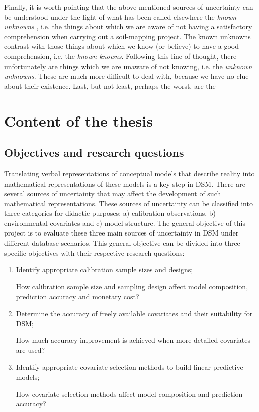 Finally, it is worth pointing that the above mentioned sources of uncertainty can be understood 
under the light of what has been called elsewhere the \textit{known unknowns} \citep{Wikipedia2015},
i.e. the things about which we are aware of not having a satisfactory comprehension when carrying 
out a soil-mapping project. The known unknowns contrast with those things about which we know (or 
believe) to have a good comprehension, i.e. the \textit{known knowns}. Following this line of 
thought, there unfortunately are things which we are unaware of not knowing, i.e. the 
\textit{unknown unknowns}. These are much more difficult to deal with, because we have no clue about 
their existence. Last, but not least, perhaps the worst, are the 


\section{Content of the thesis}

\subsection{Objectives and research questions}



Translating verbal representations of conceptual models that describe reality 
into mathematical representations of these models is a key step in DSM. There 
are several sources of uncertainty that may affect the development of such 
mathematical representations. These sources of uncertainty can be classified 
into three categories for didactic purposes: a) calibration observations, b) 
environmental covariates and c) model structure. The general objective of this 
project is to evaluate these three main sources of uncertainty in DSM under 
different database scenarios. This general objective can be divided into three 
specific objectives with their respective research questions:

\begin{enumerate}
  \item Identify appropriate calibration sample sizes and designs;

   How calibration sample size and sampling 
  design affect model composition, prediction accuracy and monetary cost?

  \item Determine the accuracy of freely available covariates and their 
  suitability for DSM;

   How much accuracy improvement is achieved 
  when more detailed covariates are used?

  \item Identify appropriate covariate selection methods to build linear 
  predictive models;

   How covariate selection methods affect model 
  composition and prediction accuracy?
\end{enumerate}


